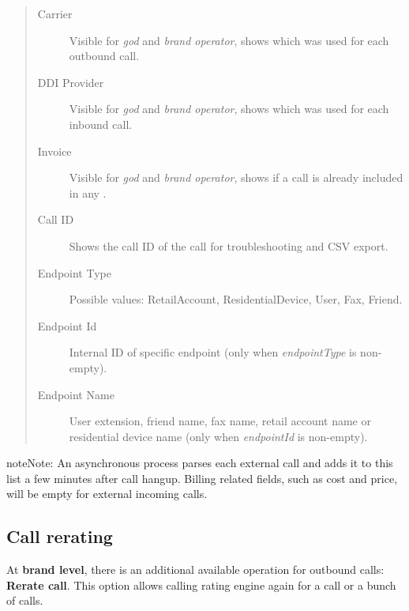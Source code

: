 \documentclass[letterpaper,10pt,english]{sphinxmanual}
\begin{document}
\begin{quote}
\begin{description}
\item[{Carrier}] \leavevmode
Visible for \emph{god} and \emph{brand operator}, shows which {\hyperref[administration_portal/brand/providers/carriers:carriers]{}} was used for each outbound call.

\item[{DDI Provider}] \leavevmode
Visible for \emph{god} and \emph{brand operator}, shows which {\hyperref[administration_portal/brand/providers/ddi_providers:ddi\string-providers]{}} was used for each inbound call.

\item[{Invoice}] \leavevmode
Visible for \emph{god} and \emph{brand operator}, shows if a call is already included in any {\hyperref[administration_portal/brand/invoicing/invoices:invoices]{}}.

\item[{Call ID}] \leavevmode
Shows the call ID of the call for troubleshooting and CSV export.

\item[{Endpoint Type}] \leavevmode
Possible values: RetailAccount, ResidentialDevice, User, Fax, Friend.

\item[{Endpoint Id}] \leavevmode
Internal ID of specific endpoint (only when \emph{endpointType} is non-empty).

\item[{Endpoint Name}] \leavevmode
User extension, friend name, fax name, retail account name or residential device name (only when \emph{endpointId} is non-empty).

\end{description}
\end{quote}

\begin{notice}{note}{Note:}
An asynchronous process parses each external call and adds it to this list a few minutes after call hangup. Billing related fields, such as cost and price, will be empty for external incoming calls.
\end{notice}


\subsection{Call rerating}
\label{administration_portal/platform/external_calls:call-rerating}
At \textbf{brand level}, there is an additional available operation for outbound calls: \textbf{Rerate call}. This option allows calling rating engine again for a call or a bunch of calls.
\end{document}
